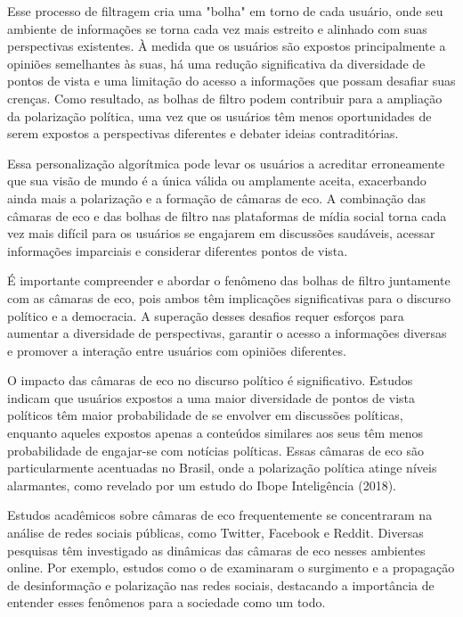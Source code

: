 Esse processo de filtragem cria uma "bolha" em torno de cada usuário, onde seu ambiente de informações se torna cada vez mais estreito e alinhado com suas perspectivas existentes. À medida que os usuários são expostos principalmente a opiniões semelhantes às suas, há uma redução significativa da diversidade de pontos de vista e uma limitação do acesso a informações que possam desafiar suas crenças. Como resultado, as bolhas de filtro podem contribuir para a ampliação da polarização política, uma vez que os usuários têm menos oportunidades de serem expostos a perspectivas diferentes e debater ideias contraditórias.

Essa personalização algorítmica pode levar os usuários a acreditar erroneamente que sua visão de mundo é a única válida ou amplamente aceita, exacerbando ainda mais a polarização e a formação de câmaras de eco. A combinação das câmaras de eco e das bolhas de filtro nas plataformas de mídia social torna cada vez mais difícil para os usuários se engajarem em discussões saudáveis, acessar informações imparciais e considerar diferentes pontos de vista.

É importante compreender e abordar o fenômeno das bolhas de filtro juntamente com as câmaras de eco, pois ambos têm implicações significativas para o discurso político e a democracia. A superação desses desafios requer esforços para aumentar a diversidade de perspectivas, garantir o acesso a informações diversas e promover a interação entre usuários com opiniões diferentes.

O impacto das câmaras de eco no discurso político é significativo. Estudos indicam que usuários expostos a uma maior diversidade de pontos de vista políticos têm maior probabilidade de se envolver em discussões políticas, enquanto aqueles expostos apenas a conteúdos similares aos seus têm menos probabilidade de engajar-se com notícias políticas. Essas câmaras de eco são particularmente acentuadas no Brasil, onde a polarização política atinge níveis alarmantes, como revelado por um estudo do Ibope Inteligência (2018).

Estudos acadêmicos sobre câmaras de eco frequentemente se concentraram na análise de redes sociais públicas, como Twitter, Facebook e Reddit. Diversas pesquisas têm investigado as dinâmicas das câmaras de eco nesses ambientes online. Por exemplo, estudos como o de \cite[p. 224]{2016_Vicario} examinaram o surgimento e a propagação de desinformação e polarização nas redes sociais, destacando a importância de entender esses fenômenos para a sociedade como um todo.

